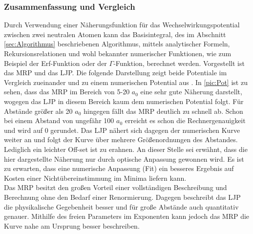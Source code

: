 \subsubsection{Zusammenfassung und Vergleich}
%
Durch Verwendung einer Näherungsfunktion für das Wechselwirkungspotential 
zwischen zwei neutralen Atomen kann das Basisintegral, des im Abschnitt 
\ref{sec:Algorithmus} beschriebenen Algorithmus, mittels 
analytischer 
Formeln, Rekursionsrelationen und wohl bekannter numerischer Funktionen, wie 
zum Beispiel der Erf-Funktion oder der $\Gamma$-Funktion, berechnet werden. 
Vorgestellt ist das MRP und das LJP. Die folgende Darstellung zeigt beide 
Potentiale im Vergleich zueinander und zu einem numerischen Potential aus 
\cite{phdthesis:sergey}.
%
%
In \ref{pic:Pot} ist zu sehen, dass das MRP im Bereich von 5-20 $a_0$ eine sehr 
gute Näherung 
darstellt, wogegen das LJP in diesem Bereich kaum dem numerischen Potential 
folgt. Für Abstände größer als 20 $a_0$ hingegen fällt das 
MRP deutlich zu 
schnell ab. Schon bei einem Abstand von ungefähr 100 $a_0$ erreicht es schon 
die Rechnergenauigkeit und wird auf 0 gerundet. Das LJP nähert sich dagegen der 
numerischen Kurve weiter an und 
folgt der Kurve 
über mehrere Größenordnungen des Abstandes. Lediglich ein leichter Off-set ist 
zu erahnen. An dieser Stelle sei erwähnt, dass die hier 
dargestellte Näherung 
nur durch optische Anpassung gewonnen wird. Es ist zu 
erwarten, dass eine 
numerische Anpassung (Fit) ein besseres Ergebnis auf Kosten 
einer 
Nichtübereinstimmung im Minima liefern kann.  \\

Das MRP besitzt den großen Vorteil einer vollständigen Beschreibung und 
Berechnung ohne den Bedarf einer Renormierung. Dagegen beschreibt das LJP die 
physikalische Gegebenheit besser und für große Abstände auch quantitativ 
genauer. Mithilfe des freien Parameters im Exponenten 
kann jedoch das MRP die Kurve nahe am Ursprung besser beschreiben. \\

